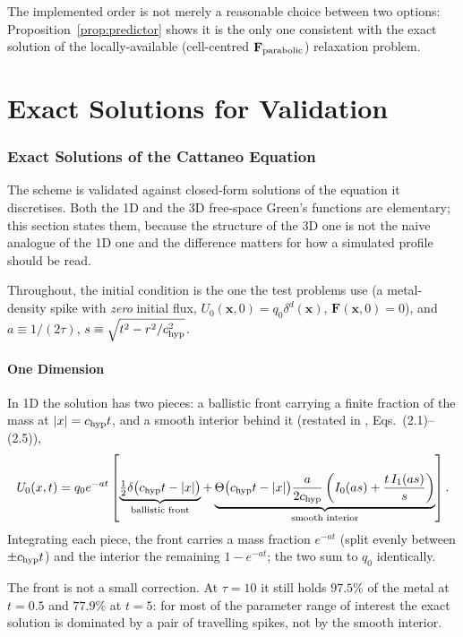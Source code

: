 \documentclass[11pt, a4paper, parskip]{scrartcl}
\theoremstyle{plain}
\theoremstyle{definition}
\theoremstyle{remark}
\newcommand{\Fdiff}{\mathbf{F}}                           %
\newcommand{\chyp}{c_{\rm hyp}}                           %
\newcommand{\taurelax}{\tau}                              %
\begin{document}
The implemented order is not merely a reasonable choice between two
options: Proposition~\ref{prop:predictor} shows it is the only one
consistent with the exact solution of the locally-available (cell-centred
$\Fdiff_{\rm parabolic}$) relaxation problem.


\part{Exact Solutions for Validation}

\section{Exact Solutions of the Cattaneo Equation}
\label{sec:exact-solutions}

The scheme is validated against closed-form solutions of the equation it
discretises. Both the 1D and the 3D free-space Green's functions are
elementary; this section states them, because the structure of the 3D one
is not the naive analogue of the 1D one and the difference matters for how
a simulated profile should be read.

Throughout, the initial condition is the one the test problems use (a
metal-density spike with \emph{zero} initial flux,
$U_0(\mathbf x,0)=q_0\delta^d(\mathbf x)$, $\Fdiff(\mathbf x,0)=0$), and
$a\equiv1/(2\taurelax)$, $s\equiv\sqrt{t^2-r^2/\chyp^2}$.

\subsection{One Dimension}
\label{sec:exact-1d}

In 1D the solution has two pieces: a ballistic front carrying a finite
fraction of the mass at $|x|=\chyp t$, and a smooth interior behind it
\cite{MasoliverPorraWeiss1993} (restated in
\cite{PruestelMeierSchellersheim2013}, Eqs.~(2.1)--(2.5)),
\begin{equation}
  \label{eq:exact-green}
  U_0(x,t) = q_0e^{-at}\left[
    \underbrace{\tfrac12\delta\big(\chyp t-|x|\big)}_{\text{ballistic front}}
    +\underbrace{\Theta\big(\chyp t-|x|\big)\frac{a}{2\chyp}
      \left(I_0(as)+\frac{t\,I_1(as)}{s}\right)}_{\text{smooth interior}}
  \right] .
\end{equation}
Integrating each piece, the front carries a mass fraction $e^{-at}$ (split
evenly between $\pm\chyp t$) and the interior the remaining $1-e^{-at}$;
the two sum to $q_0$ identically.

The front is not a small correction. At $\taurelax=10$ it still holds
$97.5\%$ of the metal at $t=0.5$ and $77.9\%$ at $t=5$: for most of the
parameter range of interest the exact solution is dominated by a pair of
travelling spikes, not by the smooth interior.
\end{document}
